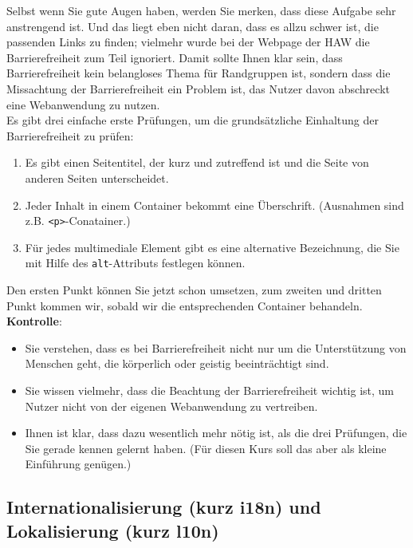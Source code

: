 Selbst wenn Sie gute Augen haben, werden Sie merken, dass diese Aufgabe sehr anstrengend ist. Und das liegt eben nicht daran, dass es allzu schwer ist, die passenden Links zu finden; vielmehr wurde bei der Webpage der HAW die Barrierefreiheit zum Teil ignoriert. Damit sollte Ihnen klar sein, dass Barrierefreiheit kein belangloses Thema für Randgruppen ist, sondern dass die Missachtung der Barrierefreiheit ein Problem ist, das Nutzer davon abschreckt eine Webanwendung zu nutzen.\\

Es gibt drei einfache erste Prüfungen, um die grundsätzliche Einhaltung der Barrierefreiheit zu prüfen:

\begin{enumerate}
	\item Es gibt einen Seitentitel, der kurz und zutreffend ist und die Seite von anderen Seiten unterscheidet.
	\item Jeder Inhalt in einem Container bekommt eine Überschrift. (Ausnahmen sind z.B. \verb|<p>|-Conatainer.)
	\item Für jedes multimediale Element gibt es eine alternative Bezeichnung, die Sie mit Hilfe des \verb|alt|-Attributs festlegen können. 
\end{enumerate}

Den ersten Punkt können Sie jetzt schon umsetzen, zum zweiten und dritten Punkt kommen wir, sobald wir die entsprechenden Container behandeln.\\

\textbf{Kontrolle}:

\begin{itemize}
	\item Sie verstehen, dass es bei Barrierefreiheit nicht nur um die Unterstützung von Menschen geht, die körperlich oder geistig beeinträchtigt sind.
	\item Sie wissen vielmehr, dass die Beachtung der Barrierefreiheit wichtig ist, um Nutzer nicht von der eigenen Webanwendung zu vertreiben.
	\item Ihnen ist klar, dass dazu wesentlich mehr nötig ist, als die drei Prüfungen, die Sie gerade kennen gelernt haben. (Für diesen Kurs soll das aber als kleine Einführung genügen.)
\end{itemize}

\subsection{Internationalisierung (kurz i18n) und Lokalisierung (kurz l10n)}

